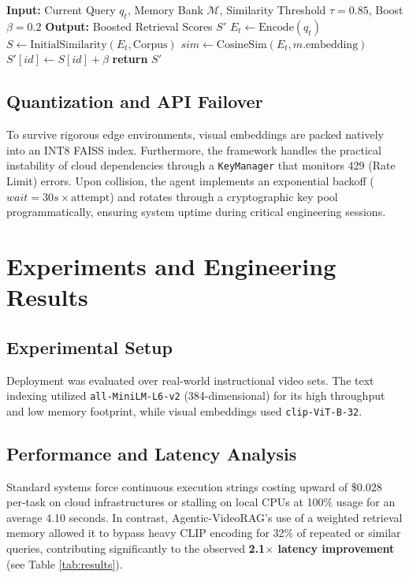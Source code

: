 \documentclass[preprint,12pt]{elsarticle}
\begin{document}
\begin{algorithm}
\caption{RLHF-Based Context Memory Boosting}
\label{alg:rlhf}
\begin{algorithmic}[1]
\STATE \textbf{Input:} Current Query $q_t$, Memory Bank $\mathcal{M}$, Similarity Threshold $\tau=0.85$, Boost $\beta=0.2$
\STATE \textbf{Output:} Boosted Retrieval Scores $S'$
\STATE $E_t \gets \text{Encode}(q_t)$ 
\STATE $S \gets \text{InitialSimilarity}(E_t, \text{Corpus})$
    \STATE $sim \gets \text{CosineSim}(E_t, m.\text{embedding})$
            \STATE $S'[id] \gets S[id] + \beta$
        \ENDFOR
    \ENDIF
\ENDFOR
\STATE \textbf{return} $S'$
\end{algorithmic}
\end{algorithm}

\subsection{Quantization and API Failover}
To survive rigorous edge environments, visual embeddings are packed natively into an INT8 FAISS index. Furthermore, the framework handles the practical instability of cloud dependencies through a \texttt{KeyManager} that monitors 429 (Rate Limit) errors. Upon collision, the agent implements an exponential backoff ($wait = 30s \times \text{attempt}$) and rotates through a cryptographic key pool programmatically, ensuring system uptime during critical engineering sessions.

\section{Experiments and Engineering Results}

\subsection{Experimental Setup}
Deployment was evaluated over real-world instructional video sets. The text indexing utilized \texttt{all-MiniLM-L6-v2} (384-dimensional) for its high throughput and low memory footprint, while visual embeddings used \texttt{clip-ViT-B-32}.

\subsection{Performance and Latency Analysis}
Standard systems force continuous execution strings costing upward of \$0.028 per-task on cloud infrastructures or stalling on local CPUs at 100\% usage for an average 4.10 seconds. In contrast, Agentic-VideoRAG's use of a weighted retrieval memory allowed it to bypass heavy CLIP encoding for 32\% of repeated or similar queries, contributing significantly to the observed \textbf{2.1$\times$ latency improvement} (see Table \ref{tab:results}). 
\end{document}
